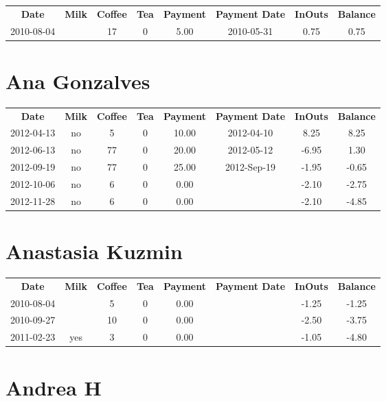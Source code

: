 \begin{center}
\begin{tabular}{cccccccc}
\textbf{Date} & \textbf{Milk} & \textbf{Coffee} & \textbf{Tea} & \textbf{Payment} & \textbf{Payment Date} & \textbf{InOuts} & \textbf{Balance} \\
2010-08-04 &  & 17 & 0 & 5.00 & 2010-05-31 & 0.75 & 0.75
\end{tabular}
\end{center}

\section{Ana Gonzalves}

\begin{center}
\begin{tabular}{cccccccc}
\textbf{Date} & \textbf{Milk} & \textbf{Coffee} & \textbf{Tea} & \textbf{Payment} & \textbf{Payment Date} & \textbf{InOuts} & \textbf{Balance} \\
2012-04-13 & no &  5 & 0 & 10.00 & 2012-04-10 &  8.25 &  8.25\\ 
2012-06-13 & no & 77 & 0 & 20.00 & 2012-05-12 & -6.95 &  1.30\\ 
2012-09-19 & no & 77 & 0 & 25.00 & 2012-Sep-19 & -1.95 & -0.65\\ 
2012-10-06 & no &  6 & 0 &  0.00 &  & -2.10 & -2.75\\ 
2012-11-28 & no &  6 & 0 &  0.00 &  & -2.10 & -4.85
\end{tabular}
\end{center}

\section{Anastasia Kuzmin}

\begin{center}
\begin{tabular}{cccccccc}
\textbf{Date} & \textbf{Milk} & \textbf{Coffee} & \textbf{Tea} & \textbf{Payment} & \textbf{Payment Date} & \textbf{InOuts} & \textbf{Balance} \\
2010-08-04 &  &  5 & 0 & 0.00 &  & -1.25 & -1.25\\ 
2010-09-27 &  & 10 & 0 & 0.00 &  & -2.50 & -3.75\\ 
2011-02-23 & yes &  3 & 0 & 0.00 &  & -1.05 & -4.80
\end{tabular}
\end{center}

\section{Andrea H}

